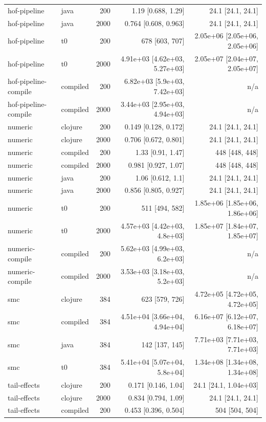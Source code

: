 \begin{tabular}{llrrr}
hof-pipeline & java & 200 & 1.19 [0.688, 1.29] & 24.1 [24.1, 24.1] \\
hof-pipeline & java & 2000 & 0.764 [0.608, 0.963] & 24.1 [24.1, 24.1] \\
hof-pipeline & t0 & 200 & 678 [603, 707] & 2.05e+06 [2.05e+06, 2.05e+06] \\
hof-pipeline & t0 & 2000 & 4.91e+03 [4.62e+03, 5.27e+03] & 2.05e+07 [2.04e+07, 2.05e+07] \\
hof-pipeline-compile & compiled & 200 & 6.82e+03 [5.9e+03, 7.42e+03] & n/a \\
hof-pipeline-compile & compiled & 2000 & 3.44e+03 [2.95e+03, 4.94e+03] & n/a \\
numeric & clojure & 200 & 0.149 [0.128, 0.172] & 24.1 [24.1, 24.1] \\
numeric & clojure & 2000 & 0.706 [0.672, 0.801] & 24.1 [24.1, 24.1] \\
numeric & compiled & 200 & 1.33 [0.91, 1.47] & 448 [448, 448] \\
numeric & compiled & 2000 & 0.981 [0.927, 1.07] & 448 [448, 448] \\
numeric & java & 200 & 1.06 [0.612, 1.1] & 24.1 [24.1, 24.1] \\
numeric & java & 2000 & 0.856 [0.805, 0.927] & 24.1 [24.1, 24.1] \\
numeric & t0 & 200 & 511 [494, 582] & 1.85e+06 [1.85e+06, 1.86e+06] \\
numeric & t0 & 2000 & 4.57e+03 [4.42e+03, 4.8e+03] & 1.85e+07 [1.84e+07, 1.85e+07] \\
numeric-compile & compiled & 200 & 5.62e+03 [4.99e+03, 6.2e+03] & n/a \\
numeric-compile & compiled & 2000 & 3.53e+03 [3.18e+03, 5.2e+03] & n/a \\
smc & clojure & 384 & 623 [579, 726] & 4.72e+05 [4.72e+05, 4.72e+05] \\
smc & compiled & 384 & 4.51e+04 [3.66e+04, 4.94e+04] & 6.16e+07 [6.12e+07, 6.18e+07] \\
smc & java & 384 & 142 [137, 145] & 7.71e+03 [7.71e+03, 7.71e+03] \\
smc & t0 & 384 & 5.41e+04 [5.07e+04, 5.8e+04] & 1.34e+08 [1.34e+08, 1.34e+08] \\
tail-effects & clojure & 200 & 0.171 [0.146, 1.04] & 24.1 [24.1, 1.04e+03] \\
tail-effects & clojure & 2000 & 0.834 [0.794, 1.09] & 24.1 [24.1, 24.1] \\
tail-effects & compiled & 200 & 0.453 [0.396, 0.504] & 504 [504, 504] \\

\end{tabular}
